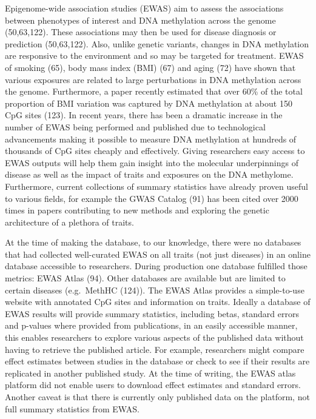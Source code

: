 \documentclass[11pt,oneside]{bristolthesis}
\begin{document}
Epigenome-wide association studies (EWAS) aim to assess the associations between phenotypes of interest and DNA methylation across the genome (50,63,122). These associations may then be used for disease diagnosis or prediction (50,63,122). Also, unlike genetic variants, changes in DNA methylation are responsive to the environment and so may be targeted for treatment. EWAS of smoking (65), body mass index (BMI) (67) and aging (72) have shown that various exposures are related to large perturbations in DNA methylation across the genome. Furthermore, a paper recently estimated that over 60\% of the total proportion of BMI variation was captured by DNA methylation at about 150 CpG sites (123). In recent years, there has been a dramatic increase in the number of EWAS being performed and published due to technological advancements making it possible to measure DNA methylation at hundreds of thousands of CpG sites cheaply and effectively. Giving researchers easy access to EWAS outputs will help them gain insight into the molecular underpinnings of disease as well as the impact of traits and exposures on the DNA methylome. Furthermore, current collections of summary statistics have already proven useful to various fields, for example the GWAS Catalog (91) has been cited over 2000 times in papers contributing to new methods and exploring the genetic architecture of a plethora of traits.

At the time of making the database, to our knowledge, there were no databases that had collected well-curated EWAS on all traits (not just diseases) in an online database accessible to researchers. During production one database fulfilled those metrics: EWAS Atlas (94). Other databases are available but are limited to certain diseases (e.g.~MethHC (124)). The EWAS Atlas provides a simple-to-use website with annotated CpG sites and information on traits. Ideally a database of EWAS results will provide summary statistics, including betas, standard errors and p-values where provided from publications, in an easily accessible manner, this enables researchers to explore various aspects of the published data without having to retrieve the published article. For example, researchers might compare effect estimates between studies in the database or check to see if their results are replicated in another published study. At the time of writing, the EWAS atlas platform did not enable users to download effect estimates and standard errors. Another caveat is that there is currently only published data on the platform, not full summary statistics from EWAS.
\end{document}
